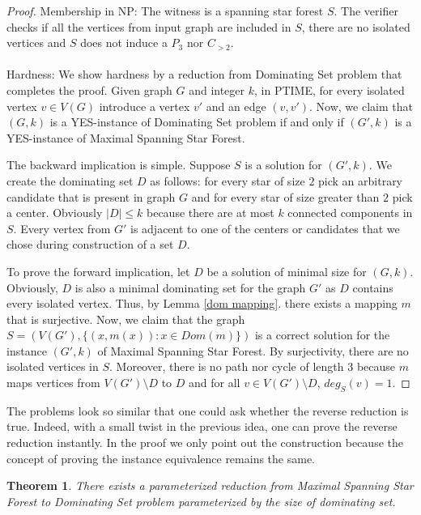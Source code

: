 \documentclass[en]{pracamgr}
\newtheorem{theorem}{Theorem}
\newcommand{\mssfp}{{\sc Maximal Spanning Star Forest}}
\newcommand{\domset}{dominating set}
\newcommand{\domsetp}{{\sc Dominating Set} problem}
\begin{document}
\begin{proof}
	Membership in NP: The witness is a spanning star forest $S$. The verifier checks if all the vertices from input graph are included in $S$, there are no isolated vertices and $S$ does not induce a $P_3$ nor $C_{> 2}$.
	\\\\
	Hardness: We show hardness by a reduction from \domsetp{} that completes the proof. Given graph $G$ and integer $k$, in PTIME, for every isolated vertex $v \in V(G)$ introduce a vertex $v'$ and an edge $(v,v')$. Now, we claim that $(G,k)$ is a YES-instance of \domsetp{} if and only if $(G',k)$ is a YES-instance of \mssfp{}. 
	
	The backward implication is simple. Suppose $S$ is a solution for $(G',k)$. We create the \domset{} $D$ as follows: for every star of size $2$ pick an arbitrary candidate that is present in graph $G$ and for every star of size greater than $2$ pick a center. Obviously $|D| \leq k$ because there are at most $k$ connected components in $S$. Every vertex from $G'$ is adjacent to one of the centers or candidates that we chose during construction of a set $D$.
	
	To prove the forward implication, let $D$ be a solution of minimal size for $(G,k)$. Obviously, $D$ is also a minimal dominating set for the graph $G'$ as $D$ contains every isolated vertex. Thus, by Lemma \ref{dom mapping}. there exists a mapping $m$ that is surjective. Now, we claim that the graph $S=(V(G'),\{(x,m(x)): x \in Dom(m)\})$ is a correct solution for the instance $(G',k)$ of \mssfp{}. By surjectivity, there are no isolated vertices in $S$. Moreover, there is no path nor cycle of length $3$ because $m$ maps vertices from $V(G') \setminus D$ to $D$ and for all $v \in V(G') \setminus D$, $deg_S(v)=1$.
	
\end{proof}

The problems look so similar that one could ask whether the reverse reduction is true. Indeed, with a small twist in the previous idea, one can prove the reverse reduction instantly. In the proof we only point out the construction because the concept of proving the instance equivalence remains the same.

\begin{theorem}\label{ssf dom}
	There exists a parameterized reduction from \mssfp{} to \domsetp{} parameterized by the size of dominating set.
\end{theorem}
\end{document}
